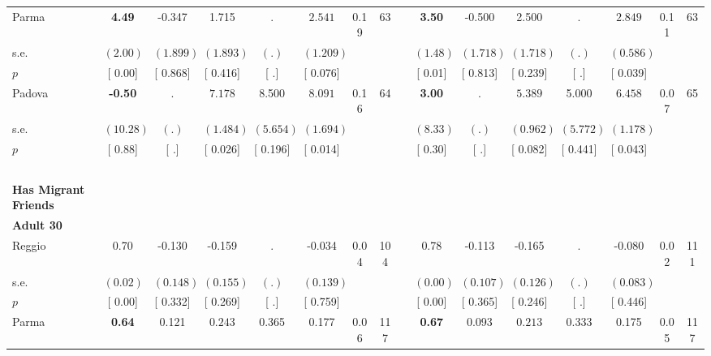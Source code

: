 \begin{longtable}{L{8em} c c c c c c c p{1em} c c c c c c c}
\quad \quad \quad Parma& \textbf{     4.49} &    -0.347 &     1.715 &         . & $ \mathbf{    2.541}$ &      0.19 &        63 & & \textbf{     3.50} &    -0.500 &     2.500 &         . & $ \mathbf{    2.849}$ &      0.11 &        63  \\*
\quad \quad \quad \quad s.e.& $ (     2.00)$ & $ (    1.899)$ & $ (    1.893)$ & $ (        .)$ & $ (    1.209)$ & & & & $ (     1.48)$ & $ (    1.718)$ & $ (    1.718)$ & $ (        .)$ & $ (    0.586)$ & &  \\*
\quad \quad \quad \quad $ p$ & [     0.00] & [    0.868] & [    0.416] & [        .] & [    0.076] & & & & [     0.01] & [    0.813] & [    0.239] & [        .] & [    0.039] & &  \\[1em]
\quad \quad \quad Padova& \textbf{    -0.50} &         . & $ \mathbf{    7.178}$ &     8.500 & $ \mathbf{    8.091}$ &      0.16 &        64 & & \textbf{     3.00} &         . & $ \mathbf{    5.389}$ &     5.000 & $ \mathbf{    6.458}$ &      0.07 &        65  \\*
\quad \quad \quad \quad s.e.& $ (    10.28)$ & $ (        .)$ & $ (    1.484)$ & $ (    5.654)$ & $ (    1.694)$ & & & & $ (     8.33)$ & $ (        .)$ & $ (    0.962)$ & $ (    5.772)$ & $ (    1.178)$ & &  \\*
\quad \quad \quad \quad $ p$ & [     0.88] & [        .] & [    0.026] & [    0.196] & [    0.014] & & & & [     0.30] & [        .] & [    0.082] & [    0.441] & [    0.043] & &  \\[1em]
~\\[1em]
\textbf{Has Migrant Friends} \\*
\quad \quad \textbf{Adult 30} & & & & & & & & & & & & & & & \\* 
\quad \quad \quad Reggio& 0.70 &    -0.130 &    -0.159 &         . &    -0.034 &      0.04 &       104 & & 0.78 &    -0.113 &    -0.165 &         . &    -0.080 &      0.02 &       111  \\*
\quad \quad \quad \quad s.e.& $ (     0.02)$ & $ (    0.148)$ & $ (    0.155)$ & $ (        .)$ & $ (    0.139)$ & & & & $ (     0.00)$ & $ (    0.107)$ & $ (    0.126)$ & $ (        .)$ & $ (    0.083)$ & &  \\*
\quad \quad \quad \quad $ p$ & [     0.00] & [    0.332] & [    0.269] & [        .] & [    0.759] & & & & [     0.00] & [    0.365] & [    0.246] & [        .] & [    0.446] & &  \\[1em]
\quad \quad \quad Parma& \textbf{     0.64} &     0.121 & $ \mathbf{    0.243}$ &     0.365 &     0.177 &      0.06 &       117 & & \textbf{     0.67} &     0.093 & $ \mathbf{    0.213}$ &     0.333 &     0.175 &      0.05 &       117  \\*

\end{longtable}
